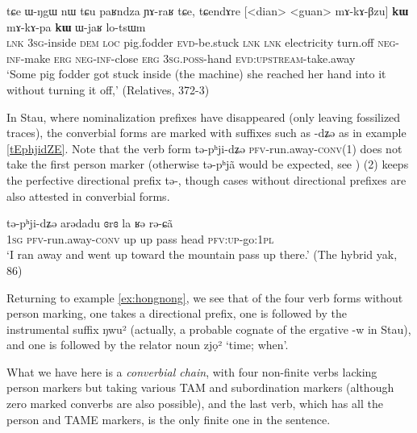 \documentclass[oldfontcommands,oneside,a4paper,11pt]{article}
\newcommand{\ipa}[1]{{\phon \mbox{#1}}} %
\begin{document}
\begin{exe}
\ex \label{ex:mAkApa.kW}
\gll
\ipa{tɕe}   	\ipa{ɯ-ŋgɯ}   	\ipa{nɯ} \ipa{tɕu}   	\ipa{paʁndza}   	\ipa{ɲɤ-raʁ}   	\ipa{tɕe,}   	\ipa{tɕendɤre}   	[<dian>   	<guan>   	\ipa{mɤ-kɤ-βzu}] 	\ipa{\textbf{kɯ}}   	\ipa{mɤ-kɤ-pa}   	\ipa{\textbf{kɯ}}   	\ipa{ɯ-jaʁ}   	\ipa{lo-tsɯm}   \\
\textsc{lnk} \textsc{3sg}-inside \textsc{dem} \textsc{loc} pig.fodder \textsc{evd}-be.stuck \textsc{lnk}
\textsc{lnk} electricity turn.off \textsc{neg-inf}-make \textsc{erg}  \textsc{neg-inf}-close \textsc{erg}  \textsc{3sg.poss}-hand \textsc{evd:upstream}-take.away \\
\glt `Some pig fodder got stuck inside (the machine) she reached her hand into it without turning it off,' (Relatives, 372-3)
\end{exe} 

In Stau, where nominalization prefixes have disappeared (only leaving fossilized traces), the converbial forms are marked with suffixes such as \ipa{-dʑə} as in example \ref{tEphjidZE}. Note that the verb form \ipa{tə-pʰji-dʑə} \textsc{pfv}-run.away-\textsc{conv}(1) does not take the first person marker (otherwise \ipa{tə-pʰjã} would be expected, see \citealt{jacques14rtau}) (2) keeps the perfective directional prefix \ipa{tə-}, though cases without directional prefixes are also attested in converbial forms.

\begin{exe}
\ex \label{tEphjidZE}
\gll \ipa{ŋa} 	\ipa{tə-pʰji-dʑə} 	\ipa{arədadu} 	\ipa{ɞrɞ} 	\ipa{la} 	\ipa{ʁə} 	\ipa{rə-ɕã} \\
 \textsc{1sg} \textsc{pfv}-run.away-\textsc{conv} up up pass head \textsc{pfv:up}-go:\textsc{1pl} \\
\glt `I ran away and went up toward the mountain pass up there.' (The hybrid yak, 86) 
\end{exe}

Returning to example \ref{ex:hongnong}, we see that of the four verb forms without person marking, one takes a directional prefix, one is followed by the instrumental suffix  \ipa{ŋwu²} (actually, a probable cognate of the ergative \ipa{-w} in Stau), and one is followed by the relator noun  \ipa{zjọ²} `time; when'. 

What we have here is a \textit{converbial chain}, with four non-finite verbs lacking person markers but taking various TAM and subordination markers (although zero marked converbs are also possible), and the last verb, which has all the person and TAME markers, is the only finite one in the sentence.
\end{document}
